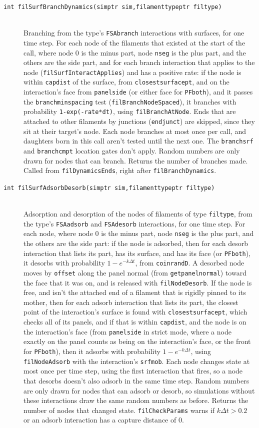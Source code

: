 \documentclass {scrbook}
\newcommand {\ttt} {\texttt}
\begin{document}
\begin{description}
\item[\ttt{int filSurfBranchDynamics(simptr sim,filamenttypeptr filtype)}] %
\hfill \\
Branching from the type's \ttt{FSAbranch} interactions with surfaces, for one time step. For each node of the filaments that existed at the start of the call, where node 0 is the minus part, node \ttt{nseg} is the plus part, and the others are the side part, and for each branch interaction that applies to the node (\ttt{filSurfInteractApplies}) and has a positive rate: if the node is within \ttt{capdist} of the surface, from \ttt{closestsurfacept}, and on the interaction's face from \ttt{panelside} (or either face for \ttt{PFboth}), and it passes the \ttt{branchminspacing} test (\ttt{filBranchNodeSpaced}), it branches with probability \ttt{1-exp(-rate*dt)}, using \ttt{filBranchAtNode}. Ends that are attached to other filaments by junctions (\ttt{endjunct}) are skipped, since they sit at their target's node. Each node branches at most once per call, and daughters born in this call aren't tested until the next one. The \ttt{branchsrf} and \ttt{branchcmpt} location gates don't apply. Random numbers are only drawn for nodes that can branch. Returns the number of branches made. Called from \ttt{filDynamicsEnds}, right after \ttt{filBranchDynamics}.

\item[\ttt{int filSurfAdsorbDesorb(simptr sim,filamenttypeptr filtype)}] %
\hfill \\
Adsorption and desorption of the nodes of filaments of type \ttt{filtype}, from the type's \ttt{FSAadsorb} and \ttt{FSAdesorb} interactions, for one time step. For each node, where node 0 is the minus part, node \ttt{nseg} is the plus part, and the others are the side part: if the node is adsorbed, then for each desorb interaction that lists its part, has its surface, and has its face (or \ttt{PFboth}), it desorbs with probability $1-e^{-k\Delta t}$, from \ttt{coinrandD}. A desorbed node moves by \ttt{offset} along the panel normal (from \ttt{getpanelnormal}) toward the face that it was on, and is released with \ttt{filNodeDesorb}. If the node is free, and isn't the attached end of a filament that is rigidly pinned to its mother, then for each adsorb interaction that lists its part, the closest point of the interaction's surface is found with \ttt{closestsurfacept}, which checks all of its panels, and if that is within \ttt{capdist}, and the node is on the interaction's face (from \ttt{panelside} in strict mode, where a node exactly on the panel counts as being on the interaction's face, or the front for \ttt{PFboth}), then it adsorbs with probability $1-e^{-k\Delta t}$, using \ttt{filNodeAdsorb} with the interaction's \ttt{srfmob}. Each node changes state at most once per time step, using the first interaction that fires, so a node that desorbs doesn't also adsorb in the same time step. Random numbers are only drawn for nodes that can adsorb or desorb, so simulations without these interactions draw the same random numbers as before. Returns the number of nodes that changed state. \ttt{filCheckParams} warns if $k\Delta t>0.2$ or an adsorb interaction has a capture distance of 0.


\end{description}
\end{document}
